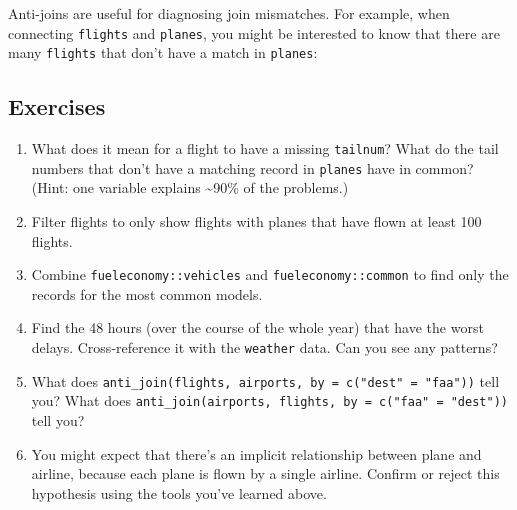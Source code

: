 \documentclass[]{book}
\newenvironment{Shaded}{\begin{snugshade}}{\end{snugshade}}
\newcommand{\KeywordTok}[1]{\textcolor[rgb]{0.13,0.29,0.53}{\textbf{{#1}}}}
\newcommand{\DataTypeTok}[1]{\textcolor[rgb]{0.13,0.29,0.53}{{#1}}}
\newcommand{\StringTok}[1]{\textcolor[rgb]{0.31,0.60,0.02}{{#1}}}
\newcommand{\CommentTok}[1]{\textcolor[rgb]{0.56,0.35,0.01}{\textit{{#1}}}}
\newcommand{\OtherTok}[1]{\textcolor[rgb]{0.56,0.35,0.01}{{#1}}}
\newcommand{\NormalTok}[1]{{#1}}
\begin{document}
Anti-joins are useful for diagnosing join mismatches. For example, when
connecting \texttt{flights} and \texttt{planes}, you might be interested
to know that there are many \texttt{flights} that don't have a match in
\texttt{planes}:

\begin{Shaded}
\end{Shaded}

\subsection{Exercises}\label{exercises-29}

\begin{enumerate}
\def\labelenumi{\arabic{enumi}.}
\item
  What does it mean for a flight to have a missing \texttt{tailnum}?
  What do the tail numbers that don't have a matching record in
  \texttt{planes} have in common? (Hint: one variable explains
  \textasciitilde{}90\% of the problems.)
\item
  Filter flights to only show flights with planes that have flown at
  least 100 flights.
\item
  Combine \texttt{fueleconomy::vehicles} and
  \texttt{fueleconomy::common} to find only the records for the most
  common models.
\item
  Find the 48 hours (over the course of the whole year) that have the
  worst delays. Cross-reference it with the \texttt{weather} data. Can
  you see any patterns?
\item
  What does
  \texttt{anti\_join(flights,\ airports,\ by\ =\ c("dest"\ =\ "faa"))}
  tell you? What does
  \texttt{anti\_join(airports,\ flights,\ by\ =\ c("faa"\ =\ "dest"))}
  tell you?
\item
  You might expect that there's an implicit relationship between plane
  and airline, because each plane is flown by a single airline. Confirm
  or reject this hypothesis using the tools you've learned above.
\end{enumerate}
\end{document}
